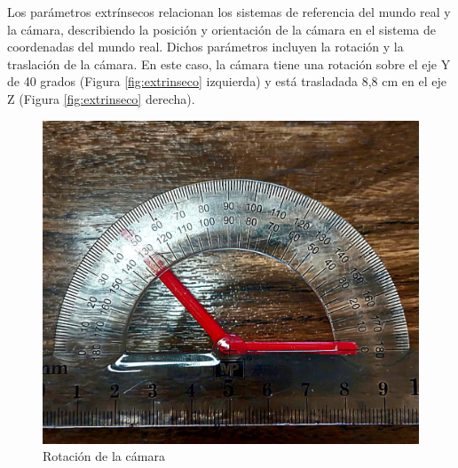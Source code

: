 Los parámetros extrínsecos relacionan los sistemas de referencia del mundo real y la cámara, describiendo la posición y orientación de la cámara en el sistema de coordenadas del mundo real. Dichos parámetros incluyen la rotación y la traslación de la cámara. En este caso, la cámara tiene una rotación sobre el eje Y de 40 grados (Figura \ref{fig:extrinseco} izquierda) y está trasladada 8,8 cm en el eje Z (Figura \ref{fig:extrinseco} derecha). 

\begin{figure}[ht!]
	\centering
	\begin{minipage}{0.45\linewidth}
		\centering
		\includegraphics[width=\linewidth]{figs/cap6/rotation.jpeg}
		\caption*{\centering Rotación de la cámara} 
	\end{minipage}
	\hspace{2 cm}
	\begin{minipage}{0.35\linewidth}
		\centering

\end{minipage}
\end{figure}
